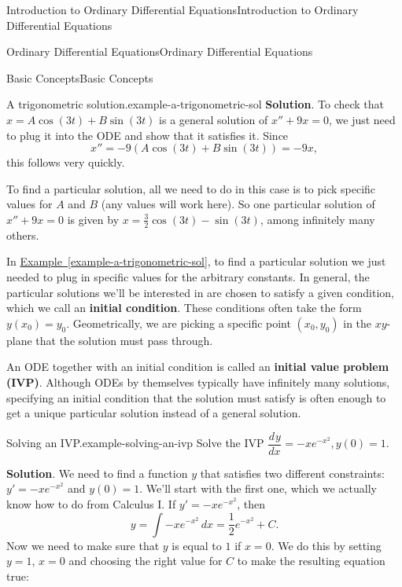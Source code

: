 \documentclass[10pt,]{book}
\newcommand{\terminology}[1]{\textbf{#1}}
\numberwithin{equation}{section}
\newcommand{\dv}[3][]{\dfrac{d^{#1} #2}{d #3^{#1}}}
\begin{document}
\begin{chapterptx}{Introduction to Ordinary Differential Equations}{}{Introduction to Ordinary Differential Equations}{}{}
\begin{sectionptx}{Ordinary Differential Equations}{}{Ordinary Differential Equations}{}{}
\begin{subsectionptx}{Basic Concepts}{}{Basic Concepts}{}{}
\begin{example}{A trigonometric solution.}{example-a-trigonometric-sol}
\noindent\textbf{Solution}.\hypertarget{solution-2}{}\quad%
\hypertarget{p-17}{}%
To check that \(x = A\cos(3t) + B\sin(3t)\) is a general solution of \(x''+9x = 0\), we just need to plug it into the ODE and show that it satisfies it. Since%
\begin{equation*}
x'' = -9(A\cos(3t)+B\sin(3t)) = -9x,
\end{equation*}
this follows very quickly.%
\par
\hypertarget{p-18}{}%
To find a particular solution, all we need to do in this case is to pick specific values for \(A\) and \(B\) (any values will work here). So one particular solution of \(x''+9x = 0\) is given by \(x = \frac{3}{2}\cos(3t) - \sin(3t)\), among infinitely many others.%
\end{example}
\hypertarget{p-19}{}%
In \hyperref[example-a-trigonometric-sol]{Example~\ref{example-a-trigonometric-sol}}, to find a particular solution we just needed to plug in specific values for the arbitrary constants. In general, the particular solutions we'll be interested in are chosen to satisfy a given condition, which we call an \terminology{initial condition}. These conditions often take the form \(y(x_{0}) = y_{0}\). Geometrically, we are picking a specific point \((x_{0},y_{0})\) in the \(xy\)-plane that the solution must pass through.%
\par
\hypertarget{p-20}{}%
An ODE together with an initial condition is called an \terminology{initial value problem (IVP)}. Although ODEs by themselves typically have infinitely many solutions, specifying an initial condition that the solution must satisfy is often enough to get a unique particular solution instead of a general solution.%
\begin{example}{Solving an IVP.}{example-solving-an-ivp}%
\hypertarget{p-21}{}%
Solve the IVP \(\dv{y}{x} = -xe^{-x^{2}}, y(0)=1\).%
\par\smallskip%
\noindent\textbf{Solution}.\hypertarget{solution-3}{}\quad%
\hypertarget{p-22}{}%
We need to find a function \(y\) that satisfies two different constraints: \(y' = -xe^{-x^{2}}\) and \(y(0)=1\). We'll start with the first one, which we actually know how to do from Calculus I. If \(y' = -xe^{-x^{2}}\), then%
\begin{equation*}
y = \int -xe^{-x^{2}}\,dx = \frac{1}{2}e^{-x^{2}}+C.
\end{equation*}
Now we need to make sure that \(y\) is equal to \(1\) if \(x=0\). We do this by setting \(y=1\), \(x=0\) and choosing the right value for \(C\) to make the resulting equation true:%

\end{example}
\end{subsectionptx}
\end{sectionptx}
\end{chapterptx}
\end{document}
